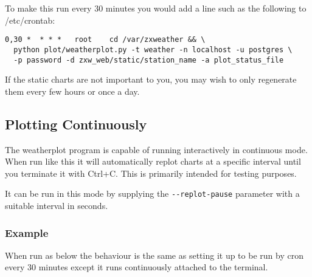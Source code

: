 \documentclass[a4paper,10pt,draft]{book}
\begin{document}
To make this run every 30 minutes you would add a line such as the following to /etc/crontab:
\begin{verbatim}
0,30 *  * * *   root    cd /var/zxweather && \
  python plot/weatherplot.py -t weather -n localhost -u postgres \
  -p password -d zxw_web/static/station_name -a plot_status_file  
\end{verbatim}

If the static charts are not important to you, you may wish to only regenerate them every few hours or once a day.

\subsection{Plotting Continuously}

The weatherplot program is capable of running interactively in continuous mode. When run like this it will automatically replot charts at a specific interval until you terminate it with Ctrl+C. This is primarily intended for testing purposes.

It can be run in this mode by supplying the \verb|--replot-pause| parameter
with a suitable interval in seconds.

\subsubsection{Example}

When run as below the behaviour is the same as setting it up to be run by cron every 30 minutes except it runs continuously attached to the terminal.
\end{document}
